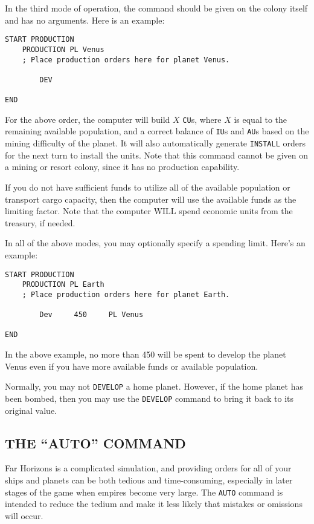 \documentclass[10pt,titlepage]{article}
\begin{document}
In the third mode of operation, the command should be given on the colony
itself and has no arguments.  Here is an example:

\begin{verbatim}
START PRODUCTION
    PRODUCTION PL Venus
    ; Place production orders here for planet Venus.

        DEV

END\end{verbatim} 


For the above order, the computer will build $X$ \texttt{CU}s, where $X$ is equal to the
remaining available population, and a correct balance of \texttt{IU}s and \texttt{AU}s based on
the mining difficulty of the planet.  It will also automatically generate
\texttt{INSTALL} orders for the next turn to install the units.  Note that this command
cannot be given on a mining or resort colony, since it has no production
capability.

If you do not have sufficient funds to utilize all of the available population
or transport cargo capacity, then the computer will use the available funds as
the limiting factor.  Note that the computer WILL spend economic units from the
treasury, if needed.

In all of the above modes, you may optionally specify a spending limit.  Here's
an example:

\begin{verbatim}
START PRODUCTION
    PRODUCTION PL Earth
    ; Place production orders here for planet Earth.

        Dev     450     PL Venus

END\end{verbatim} 


In the above example, no more than 450 will be spent to develop the planet
Venus even if you have more available funds or available population.

Normally, you may not \texttt{DEVELOP} a home planet.  However, if the home planet has
been bombed, then you may use the \texttt{DEVELOP} command to bring it back to its
original value.


\subsection{THE ``AUTO'' COMMAND}
\label{sec:autocommand}


Far Horizons is a complicated simulation, and providing orders for all of your
ships and planets can be both tedious and time-consuming, especially in later
stages of the game when empires become very large.  The \texttt{AUTO} command is
intended to reduce the tedium and make it less likely that mistakes or
omissions will occur.
\end{document}
